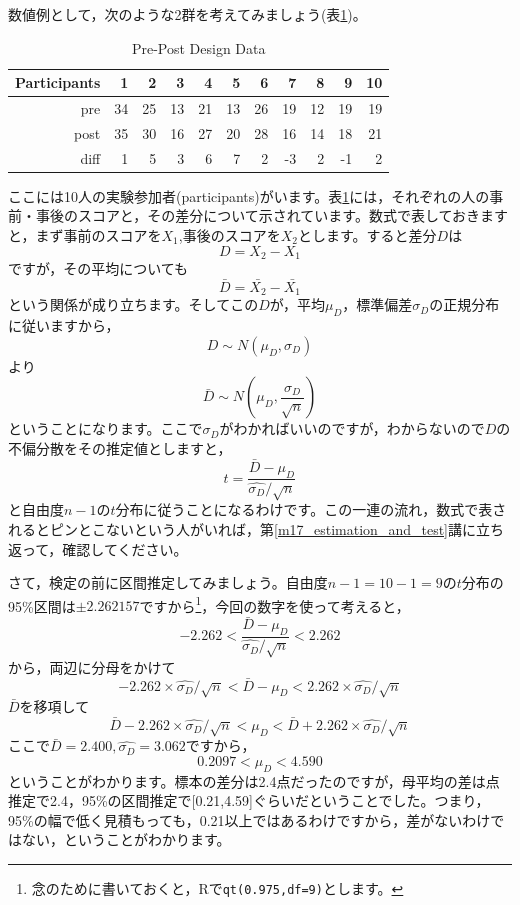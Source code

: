\documentclass{ltjsarticle}
\begin{document}
数値例として，次のような2群を考えてみましょう(表\ref{tbl19::01})。
\begin{table}[ht]
	\centering
	\caption{Pre-Post Design Data}
	\begin{tabular}{rrrrrrrrrrr}
		\hline
		Participants & 1  & 2  & 3  & 4  & 5  & 6  & 7  & 8  & 9  & 10 \\
		\hline
		pre          & 34 & 25 & 13 & 21 & 13 & 26 & 19 & 12 & 19 & 19 \\
		post         & 35 & 30 & 16 & 27 & 20 & 28 & 16 & 14 & 18 & 21 \\ \hline
		diff         & 1  & 5  & 3  & 6  & 7  & 2  & -3 & 2  & -1 & 2  \\
		\hline
	\end{tabular}
	\label{tbl19::01}
\end{table}
ここには10人の実験参加者(participants)がいます。表\ref{tbl19::01}には，それぞれの人の事前・事後のスコアと，その差分について示されています。数式で表しておきますと，まず事前のスコアを$X_1$,事後のスコアを$X_2$とします。すると差分$D$は
\[ D = X_2 - X_1 \]
ですが，その平均についても
\[ \bar{D} = \bar{X_2} - \bar{X_1} \]
という関係が成り立ちます。そしてこの$D$が，平均$\mu_D$，標準偏差$\sigma_D$の正規分布に従いますから，
\[ D \sim N(\mu_D,\sigma_D)\]
より
\[ \bar{D} \sim N(\mu_D,\frac{\sigma_D}{\sqrt{n}}) \]
ということになります。ここで$\sigma_D$がわかればいいのですが，わからないので$D$の不偏分散をその推定値としますと，
\[ t = \frac{\bar{D}-\mu_D}{\hat{\sigma_D}/\sqrt{n}} \]
と自由度$n-1$の$t$分布に従うことになるわけです。この一連の流れ，数式で表されるとピンとこないという人がいれば，第\ref{m17_estimation_and_test}講に立ち返って，確認してください。

さて，検定の前に区間推定してみましょう。自由度$n-1=10-1=9$の$t$分布の95\%区間は$\pm 2.262157$ですから\footnote{念のために書いておくと，Rで\texttt{qt(0.975,df=9)}とします。}，今回の数字を使って考えると，
\[ -2.262 < \frac{\bar{D}-\mu_D}{\hat{\sigma_D}/\sqrt{n}} < 2.262 \]
から，両辺に分母をかけて
\[ -2.262 \times \hat{\sigma_D}/\sqrt{n} < \bar{D}-\mu_D < 2.262 \times \hat{\sigma_D}/\sqrt{n} \]
$\bar{D}$を移項して
\[ \bar{D}-2.262 \times \hat{\sigma_D}/\sqrt{n} < \mu_D < \bar{D}+2.262\times \hat{\sigma_D}/\sqrt{n} \]
ここで$\bar{D} = 2.400,\hat{\sigma_D} = 3.062$ですから，
\[ 0.2097 < \mu_D < 4.590 \]
ということがわかります。標本の差分は2.4点だったのですが，母平均の差は点推定で2.4，95\%の区間推定で[0.21,4.59]ぐらいだということでした。つまり，95\%の幅で低く見積もっても，0.21以上ではあるわけですから，差がないわけではない，ということがわかります。
\end{document}
